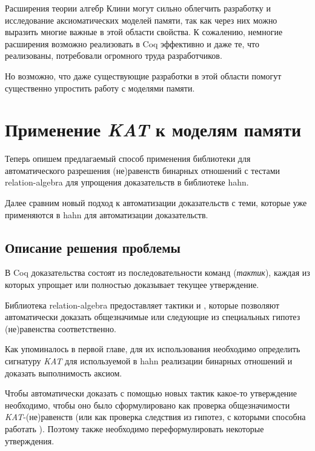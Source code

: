 \documentclass[times
              ,specification
              ,annotation
              ]{itmo-student-thesis}
\begin{document}
  \chapterconclusion
    Расширения теории алгебр Клини могут сильно облегчить разработку и исследование аксиоматических моделей памяти,
    так как через них можно выразить многие важные в этой области свойства. К сожалению, немногие
    расширения возможно реализовать в Coq эффективно и даже те, что реализованы, потребовали огромного труда разработчиков.

    Но возможно, что даже существующие разработки в этой области помогут существенно упростить
    работу с моделями памяти. 

\chapter{Применение \textit{KAT} к моделям памяти}\label{chapter:2}

  Теперь опишем предлагаемый способ применения библиотеки для автоматического разрешения (не)равенств
  бинарных отношений с тестами relation-algebra для упрощения доказательств в библиотеке hahn.

  Далее сравним новый подход к автоматизации доказательств с теми, которые уже применяются в hahn для автоматизации доказательств.

  \section{Описание решения проблемы}

    В Coq доказательства состоят из последовательности команд (\textit{тактик}), каждая из
    которых упрощает или полностью доказывает текущее утверждение.

    Библиотека relation-algebra предоставляет тактики  и ,
    которые позволяют автоматически доказать общезначимые или следующие из специальных гипотез
    (не)равенства соответственно.

    Как упоминалось в первой главе, для их использования необходимо определить сигнатуру \textit{KAT} для
    используемой в hahn реализации бинарных отношений и доказать выполнимость аксиом.

    Чтобы автоматически доказать с помощью новых тактик какое-то утверждение необходимо, чтобы оно было
    сформулировано как проверка общезначимости \textit{KAT}-(не)равенств (или как проверка следствия из
    гипотез, с которыми способна работать ).
    Поэтому также необходимо переформулировать некоторые утверждения.
\end{document}
